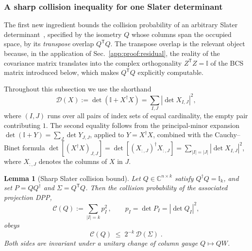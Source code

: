 \documentclass[prx,twocolumn,superscriptaddress,aps,10pt, frontmatterverbose, reprint,footinbib,longbibliography=true]{revtex4-2}
\newtheorem{lemma}{Lemma}
\newcommand{\trans}{\mathsf{T}}
\providecommand{\DIFaddtex}[1]{{\protect\color{red}#1}} %
\providecommand{\DIFaddbegin}{\protect\color{red}} %
\providecommand{\DIFaddend}{\protect\color{black}} %
\providecommand{\DIFaddtex}[1]{\texorpdfstring{\DIFaddtex{#1}}{#1}} %
\providecommand{\DIFadd}[1]{\texorpdfstring{\DIFaddtex{#1}}{#1}} %
\newcommand{\DIFaddincludegraphics}[2][]{{\color{blue}\fbox{\DIFOincludegraphics[#1]{#2}}}} %
\DeclareRobustCommand{\DIFaddbegin}{\DIFOaddbegin \let\includegraphics\DIFaddincludegraphics} %
\DeclareRobustCommand{\DIFaddend}{\DIFOaddend \let\includegraphics\DIFOincludegraphics} %
\begin{document}
\subsubsection{A sharp collision inequality for one Slater determinant}
\label{app:proof:slater}

The first new ingredient bounds the collision probability of an arbitrary Slater determinant~\cite{Mbeng2024,surace}, specified by the isometry $Q$ whose columns span the occupied space, by its \emph{transpose} overlap $Q^{\trans}Q$. The transpose \DIFaddbegin \DIFadd{overlap is the relevant object because, in the application of Sec.~\ref{app:proof:residual}, the reality of the covariance matrix translates into the complex orthogonality $Z^{\trans}Z=\mathbb{I}$ of the BCS matrix introduced below, which makes $Q^{\trans}Q$ explicitly computable}\DIFaddend .

Throughout this subsection we use the shorthand
\begin{equation}
    \mathcal{D}(X):=\det\!\left(\mathbb{I}+X^\dagger X\right)
    =\sum_{I,J}\left|\det X_{I,J}\right|^2 ,
    \label{eq:Dfunctional}
\end{equation}
\DIFaddbegin \DIFadd{where }\DIFaddend $(I,J)$ runs over all pairs of index sets of equal cardinality, the empty pair contributing $1$. \DIFaddbegin \DIFadd{The second equality follows from the principal-minor expansion $\det(\mathbb{I}+Y)=\sum_J\det Y_{J,J}$, applied to $Y=X^\dagger X$, combined with the Cauchy--Binet formula $\det[(X^\dagger X)_{J,J}]=\det[(X_{:,J})^\dagger X_{:,J}]=\sum_{|I|=|J|}|\det X_{I,J}|^2$, where $X_{:,J}$ denotes the columns of $X$ in $J$.
}\DIFaddend 

\begin{lemma}[Sharp Slater collision bound]
\label{lem:Slater-bound}
Let $Q\in\mathbb{C}^{n\times k}$ satisfy $Q^\dagger Q=\mathbb{I}_k$, and set $P=QQ^\dagger$ and $\Sigma=Q^{\trans}Q$. Then the collision probability of the associated projection DPP,
\begin{equation}
    \mathcal{C}(Q):=\sum_{|I|=k}p_I^2\,,
    \qquad p_I=\det P_I=\left|\det Q_I\right|^2 ,
\end{equation}
obeys
\begin{equation}
    \mathcal{C}(Q)\;\le\;2^{-k}\,\mathcal{D}(\Sigma)\;.
    \label{eq:Slater-bound}
\end{equation}
Both sides are invariant under a unitary change of column gauge $Q\mapsto QW$.
\end{lemma}
\end{document}
